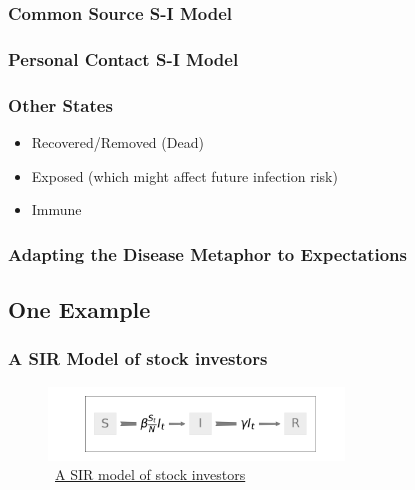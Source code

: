 \documentclass[pdflatex]{beamer}
\begin{document}
\begin{frame}\frametitle{Common Source S-I Model}

\end{frame}

\begin{frame}\frametitle{Personal Contact S-I Model}
    
\end{frame}

\begin{frame}\frametitle{Other States}
\begin{itemize}
    \item Recovered/Removed (Dead)
    \item Exposed (which might affect future infection risk)
    \item Immune
\end{itemize}
\end{frame}

\subsubsection{Adapting the Disease Metaphor to Expectations}\label{subsubsec:AdaptingTheModel}

\hypertarget{AdaptingTheModel}{}


\subsection{One Example}
\label{subsec:shillerpound}

\begin{frame}
	\frametitle{A SIR Model of stock investors \citep{shiller1989survey} }
	\begin{figure}[!ht] \centering  %
		\caption{ ~\href{https://mybinder.org/v2/gh/llorracc/EpiExp/HEAD?filepath=SIR_Ndlib.ipynb}{A SIR model of stock investors}}
		\label{fig:sir_diagram}
		\centerline{\includegraphics[width=0.7\textwidth]{./figures/flow_diagram.png}}
	\end{figure}
\end{frame}
\end{document}
